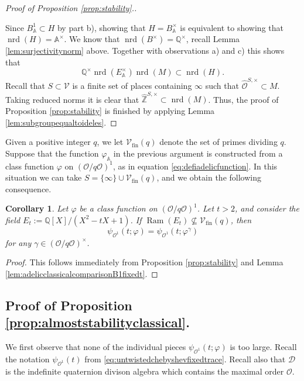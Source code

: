 \documentclass{article}
\newtheorem{cor}[lem]{Corollary}
\theoremstyle{named}
\newcommand{\D}{\mathcal{D}}
\newcommand{\Z}{\mathbb{Z}}
\newcommand{\A}{\mathbb{A}}
\newcommand{\Q}{\mathbb{Q}}
\renewcommand{\O}{\mathcal{O}}
\newcommand{\Pl}{\mathcal{V}}
\newcommand{\Primes}{\mathcal{V}_{\text{fin}}}
\DeclareMathOperator{\Ram}{Ram}
\DeclareMathOperator{\nrd}{nrd}
\begin{document}
\begin{proof}[Proof of Proposition \ref{prop:stability}.]
\begin{enumerate}
\end{enumerate}
Since $B^1_\A \subset H$ by part b), showing that $H = B_\A^\times$ is equivalent to showing that $\nrd(H) =\A^\times$. We know that $\nrd(B^\times) = \Q^\times$, recall Lemma \ref{lem:surjectivitynorm} above. Together with observations a) and c) this shows that 
\begin{equation*}
    \Q^\times \nrd(E_\A^\times)\nrd(M) \subset \nrd(H).
\end{equation*}
Recall that $S \subset \Pl$ is a finite set of places containing  $\infty$ such that $\widehat{\O}^{S, \times} \subset M$. Taking reduced norms it is clear that $\widehat{\Z}^{S, \times} \subset \nrd(M)$. Thus, the proof of Proposition \ref{prop:stability} is finished by applying Lemma \ref{lem:subgroupequaltoideles}.
\end{proof}

Given a positive integer $q$, we let $\Primes(q)$ denote the set of primes dividing $q$. Suppose that the function $\varphi_\A$ in the previous argument is constructed from a class function $\varphi$ on $(\O/q\O)^1$, as in equation \eqref{eq:defiadelicfunction}. In this situation we can take $S = \{\infty\} \cup \Primes(q)$, and we obtain the following consequence. 

\begin{cor}\label{cor:almoststabilityclassical}
Let $\varphi$ be a class function on $(\O/q\O)^1$. Let $t > 2$, and consider the field $E_t := \Q[X]/(X^2 - tX + 1)$. If $\Ram(E_t) \nsubseteq \Primes(q)$, then 
\begin{equation*}
    \psi_{\O^1}(t; \varphi) = \psi_{\O^1}(t; \varphi^\gamma)
\end{equation*}
for any $\gamma \in (\O/q\O)^\times$. 
\end{cor}
\begin{proof}
This follows immediately from Proposition \ref{prop:stability} and Lemma \ref{lem:adelicclassicalcomparisonB1fixedt}.
\end{proof}

\subsection{Proof of Proposition \ref{prop:almoststabilityclassical}.}\label{subsec:proofofalmoststability}
We first observe that none of the individual pieces $\psi_{\O^1}(t; \varphi)$ is too large. Recall the notation $\psi_{\O^1}(t)$ from \eqref{eq:untwistedchebyshevfixedtrace}. Recall also that $\D$ is the indefinite quaternion divison algebra which contains the maximal order $\O$.
\end{document}

